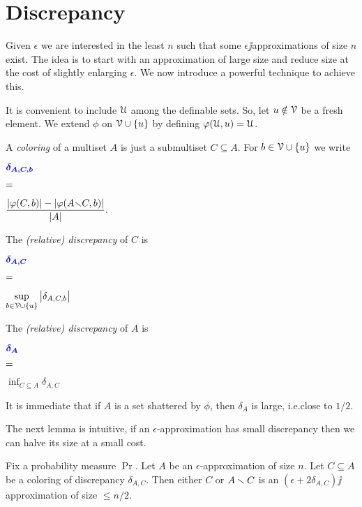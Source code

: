 \documentclass[sputnik.tex]{subfiles}
\begin{document}
\section{Discrepancy}\label{epsilon_approximations}

\def\ceq#1#2#3{\parbox[t]{30ex}{$\displaystyle #1$}\parbox{5ex}{$\displaystyle\hfil #2$}{$\displaystyle #3$}}

Given $\epsilon$ we are interested in the least $n$ such that some $\epsilon\jj$approximations of size $n$ exist.
The idea is to start with an approximation of large size and reduce size at the cost of slightly enlarging $\epsilon$.
We now introduce a powerful technique to achieve this.

It is convenient to include $\EuScript U$ among the definable sets. So, let $u\notin\EuScript V$ be a fresh element. We extend $\phi$ on $\EuScript V\cup\{u\}$ by defining \emph{$\varphi(\EuScript U,u)=\EuScript U$}. 

A \emph{coloring\/} of a multiset $A$ is just a submultiset $C\subseteq A$.
For $b\in\EuScript V\cup\{u\}$ we write 

\ceq{\hfill\emph{$\delta_{A,C,b}$}}{=}{\frac{|\phi(C,b)|-|\phi(A{\sm} C,b)|}{|A|}.}

The \emph{(relative) discrepancy\/} of $C$ is\smallskip

\ceq{\hfill\emph{$\delta_{A,C}$}}{=}{\sup_{b\in\V\cup\{u\}}\big|\delta_{A,C,b}\big|}

The \emph{(relative) discrepancy\/} of $A$ is 

\ceq{\hfill \emph{$\delta_A$}}{=}{\inf_{C\subseteq A}\delta_{A,C}}

\smallskip
It is immediate that if $A$ is a set shattered by $\phi$, then $\delta_A$ is large, i.e.\@ close to $1/2$.

The next lemma is intuitive, if an $\epsilon$-approximation has small discrepancy then we can halve its size at a small cost.

\begin{lemma}\label{lem_aprossimazionediapprossimazione}
Fix a probability measure\/ $\Pr$. Let $A$ be an $\epsilon$-approximation of size $n$.
Let $C\subseteq A$ be a coloring of discrepancy $\delta_{A,C}$.
Then either $C$ or $A\smallsetminus C$ is an $(\epsilon+2\delta_{A,C})\jj$approximation of size $\le n/2$.
\end{lemma}
\end{document}
